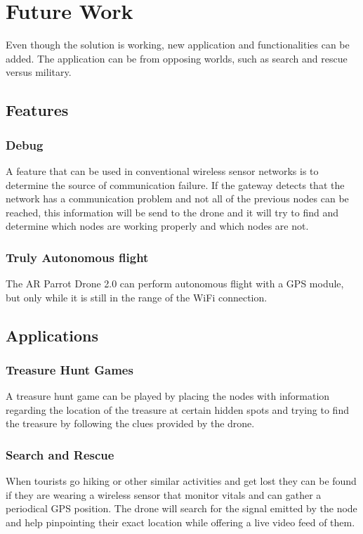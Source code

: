 \normalfont\normalsize
\chapter{Future Work}

Even though the solution is working, new application and functionalities can be added. The application can be from opposing worlds, such as search and rescue versus military.


\section{Features}

\subsection{Debug}

A feature that can be used in conventional wireless sensor networks is to determine the source of communication failure. If the gateway detects that the network has a communication problem and not all of the previous nodes can be reached, this information will be send to the drone and it will try to find and determine which nodes are working properly and which nodes are not.

\subsection{Truly Autonomous flight}
The AR Parrot Drone 2.0 can perform autonomous flight with a GPS module, but only while it is still in the range of the WiFi connection.

\section{Applications}

\subsection{Treasure Hunt Games}
A treasure hunt game can be played by placing the nodes with information regarding the location of the treasure at certain hidden spots and trying to find the treasure by following the clues provided by the drone.

\subsection{Search and Rescue}


When tourists go hiking or other similar activities and get lost they can be found if they are wearing a wireless sensor that monitor vitals and can gather a periodical GPS position. The drone will search for the signal emitted by the node and help pinpointing their exact location while offering a live video feed of them.

\clearpage

